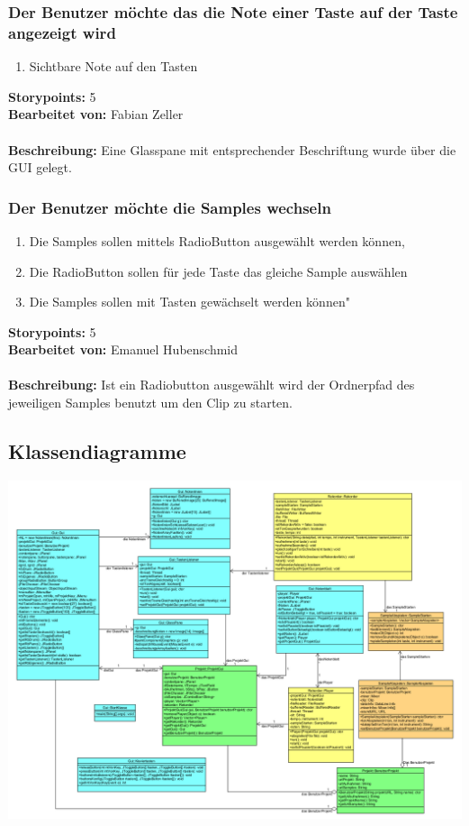 \subsubsection{Der Benutzer möchte das die Note einer Taste auf der Taste angezeigt wird}

\begin{enumerate}
 \item Sichtbare Note auf den Tasten
\end{enumerate}

\textbf{Storypoints:} 5 \\
\textbf{Bearbeitet von:} Fabian Zeller \\
\\
\textbf{Beschreibung:} Eine Glasspane mit entsprechender Beschriftung wurde über die GUI gelegt.


\subsubsection{Der Benutzer möchte die Samples wechseln}

\begin{enumerate}
 \item Die Samples sollen mittels RadioButton ausgewählt werden können,
 \item Die RadioButton sollen für jede Taste das gleiche Sample auswählen
 \item Die Samples sollen mit Tasten gewächselt werden können"
\end{enumerate}

\textbf{Storypoints:} 5 \\
\textbf{Bearbeitet von:} Emanuel Hubenschmid \\
\\
\textbf{Beschreibung:} Ist ein Radiobutton ausgewählt wird der Ordnerpfad 
des jeweiligen Samples benutzt um den Clip zu starten.

\newpage


\subsection{Klassendiagramme}

\includegraphics[angle={90},width=\linewidth,height=\textheight,
keepaspectratio]{Bilder/Klassendiagramm.PNG} 


